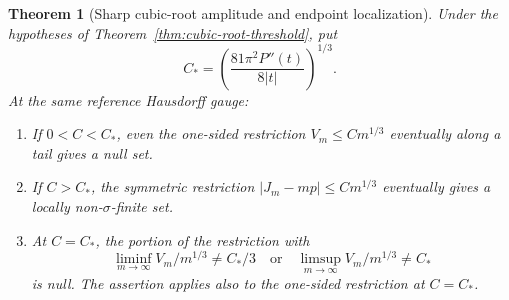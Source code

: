 \documentclass[11pt]{article}
\newtheorem{theorem}{Theorem}
\theoremstyle{definition}
\theoremstyle{remark}
\begin{document}
\begin{theorem}[Sharp cubic-root amplitude and endpoint localization]
\label{thm:sharp-cubic-amplitude}
Under the hypotheses of Theorem~\ref{thm:cubic-root-threshold},
put
\[
 C_*=\left(\frac{81\pi^2P''(t)}{8|t|}\right)^{1/3}.
\]
At the same reference Hausdorff gauge:
\begin{enumerate}
\item If $0<C<C_*$, even the one-sided restriction
$V_m\le C m^{1/3}$ eventually along a tail gives a null set.
\item If $C>C_*$, the symmetric restriction
$|J_m-mp|\le C m^{1/3}$ eventually gives a locally
non-$\sigma$-finite set.
\item At $C=C_*$, the portion of the restriction with
\[
 \liminf_{m\to\infty} V_m/m^{1/3}\ne C_*/3
 \quad\text{or}\quad
 \limsup_{m\to\infty} V_m/m^{1/3}\ne C_*
\]
is null. The assertion applies also to the one-sided
restriction at $C=C_*$.
\end{enumerate}
\end{theorem}
\end{document}
